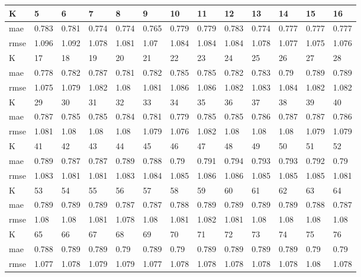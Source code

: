 \begin{appendices}
\begin{center} 
	\begin{tabularx}{\textwidth}{|l|X|X|X|X|X|X|X|X|X|X|X|X|} 
		\hline 
		K & 5 & 6 & 7 & 8 & 9 & 10 & 11 & 12 & 13 & 14 & 15 & 16 \\ \hline 
		mae & 0.783 & 0.781 & 0.774 & 0.774 & 0.765 & 0.779 & 0.779 & 0.783 & 0.774 & 0.777 & 0.777 & 0.777 \\ \hline 
		rmse & 1.096 & 1.092 & 1.078 & 1.081 & 1.07 & 1.084 & 1.084 & 1.084 & 1.078 & 1.077 & 1.075 & 1.076 \\ \hline 
		\hline 
		K & 17 & 18 & 19 & 20 & 21 & 22 & 23 & 24 & 25 & 26 & 27 & 28 \\ \hline 
		mae & 0.778 & 0.782 & 0.787 & 0.781 & 0.782 & 0.785 & 0.785 & 0.782 & 0.783 & 0.79 & 0.789 & 0.789 \\ \hline 
		rmse & 1.075 & 1.079 & 1.082 & 1.08 & 1.081 & 1.086 & 1.086 & 1.082 & 1.083 & 1.084 & 1.082 & 1.082 \\ \hline 
		\hline 
		K & 29 & 30 & 31 & 32 & 33 & 34 & 35 & 36 & 37 & 38 & 39 & 40 \\ \hline 
		mae & 0.787 & 0.785 & 0.785 & 0.784 & 0.781 & 0.779 & 0.785 & 0.785 & 0.786 & 0.787 & 0.787 & 0.786 \\ \hline 
		rmse & 1.081 & 1.08 & 1.08 & 1.08 & 1.079 & 1.076 & 1.082 & 1.08 & 1.08 & 1.08 & 1.079 & 1.079 \\ \hline 
		\hline 
		K & 41 & 42 & 43 & 44 & 45 & 46 & 47 & 48 & 49 & 50 & 51 & 52 \\ \hline 
		mae & 0.789 & 0.787 & 0.787 & 0.789 & 0.788 & 0.79 & 0.791 & 0.794 & 0.793 & 0.793 & 0.792 & 0.79 \\ \hline 
		rmse & 1.083 & 1.081 & 1.081 & 1.083 & 1.084 & 1.085 & 1.086 & 1.086 & 1.085 & 1.085 & 1.085 & 1.081 \\ \hline 
		\hline 
		K & 53 & 54 & 55 & 56 & 57 & 58 & 59 & 60 & 61 & 62 & 63 & 64 \\ \hline 
		mae & 0.789 & 0.789 & 0.789 & 0.787 & 0.787 & 0.788 & 0.789 & 0.789 & 0.789 & 0.789 & 0.788 & 0.787 \\ \hline 
		rmse & 1.08 & 1.08 & 1.081 & 1.078 & 1.08 & 1.081 & 1.082 & 1.081 & 1.08 & 1.08 & 1.08 & 1.08 \\ \hline 
		\hline 
		K & 65 & 66 & 67 & 68 & 69 & 70 & 71 & 72 & 73 & 74 & 75 & 76 \\ \hline 
		mae & 0.788 & 0.789 & 0.789 & 0.79 & 0.789 & 0.79 & 0.789 & 0.789 & 0.789 & 0.789 & 0.79 & 0.79 \\ \hline 
		rmse & 1.077 & 1.078 & 1.079 & 1.079 & 1.077 & 1.078 & 1.078 & 1.078 & 1.078 & 1.078 & 1.08 & 1.078 \\ \hline 

\end{tabularx}
\end{center}
\end{appendices}

